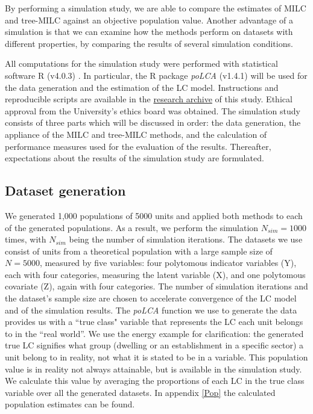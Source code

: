 \documentclass[a4paper, 11pt]{article} %
\begin{document}
By performing a simulation study, we are able to compare the estimates of MILC and tree-MILC against an objective population value. Another advantage of a simulation is that we can examine how the methods perform on datasets with different properties, by comparing the results of several simulation conditions. 

All computations for the simulation study were performed with statistical software R (v4.0.3) \cite{Rproject}. In particular, the R package \textit{poLCA} (v1.4.1) \cite{poLCA_package} will be used for the data generation and the estimation of the LC model. Instructions and reproducible scripts are available in the \href{https://github.com/daniellerem/Thesis-treeMILC}{research archive} of this study. Ethical approval from the University's ethics board was obtained. The simulation study consists of three parts which will be discussed in order: the data generation, the appliance of the MILC and tree-MILC methods, and the calculation of performance measures used for the evaluation of the results. Thereafter, expectations about the results of the simulation study are formulated.

\subsection{Dataset generation} \label{Dataset_generation}
We generated 1,000 populations of 5000 units and applied both methods to each of the generated populations. As a result, we perform the simulation $N_{sim}= 1000$ times, with $N_{sim}$ being the number of simulation iterations. The datasets we use consist of units from a theoretical population with a large sample size of $N=5000$, measured by five variables: four polytomous indicator variables (Y), each with four categories, measuring the latent variable (X), and one polytomous covariate (Z), again with four categories. The number of simulation iterations and the dataset's sample size are chosen to accelerate convergence of the LC model and of the simulation results. The \textit{poLCA} function we use to generate the data provides us with a ``true class" variable that represents the LC each unit belongs to in the ``real world''. We use the energy example for clarification: the generated true LC signifies what group (dwelling or an establishment in a specific sector) a unit belong to in reality, not what it is stated to be in a variable. This population value is in reality not always attainable, but is available in the simulation study. We calculate this value by averaging the proportions of each LC in the true class variable over all the generated datasets. In appendix \ref{Pop} the calculated population estimates can be found. 
\end{document}
